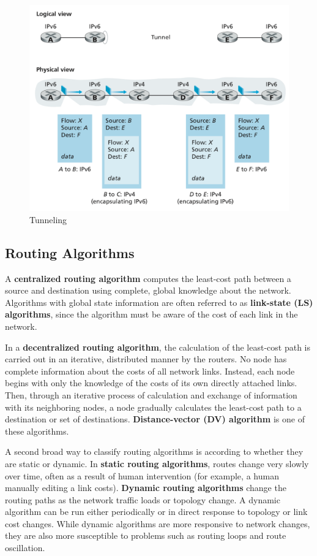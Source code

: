 \documentclass[11pt]{article}
\begin{document}
\begin{figure}[h]
	\centering
	\includegraphics[width=0.8\linewidth]{images/Tunneling.png}
	\caption{Tunneling}
	\label{fig:Tunneling}
\end{figure}

\subsection{Routing Algorithms}

A \textbf{centralized routing algorithm} computes the least-cost path between a source and destination using complete, global knowledge about the network. Algorithms with global state information are often referred to as \textbf{link-state (LS) algorithms}, since the algorithm must be aware of the cost of each link in the network.

In a \textbf{decentralized routing algorithm}, the calculation of the least-cost path is carried out in an iterative, distributed manner by the routers. No node has complete information about the costs of all network links. Instead, each node begins with only the knowledge of the costs of its own directly attached links. Then, through an iterative process of calculation and exchange of information with its neighboring nodes, a node gradually calculates the least-cost path to a destination or set of destinations. \textbf{Distance-vector (DV) algorithm} is one of these algorithms.

A second broad way to classify routing algorithms is according to whether they are static or dynamic. In \textbf{static routing algorithms}, routes change very slowly over time, often as a result of human intervention (for example, a human manually editing a link costs). \textbf{Dynamic routing algorithms} change the routing paths as the network traffic loads or topology change. A dynamic algorithm can be run either periodically or in direct response to topology or link cost changes. While dynamic algorithms are more responsive to network changes, they are also more susceptible to problems such as routing loops and route oscillation.
\end{document}
